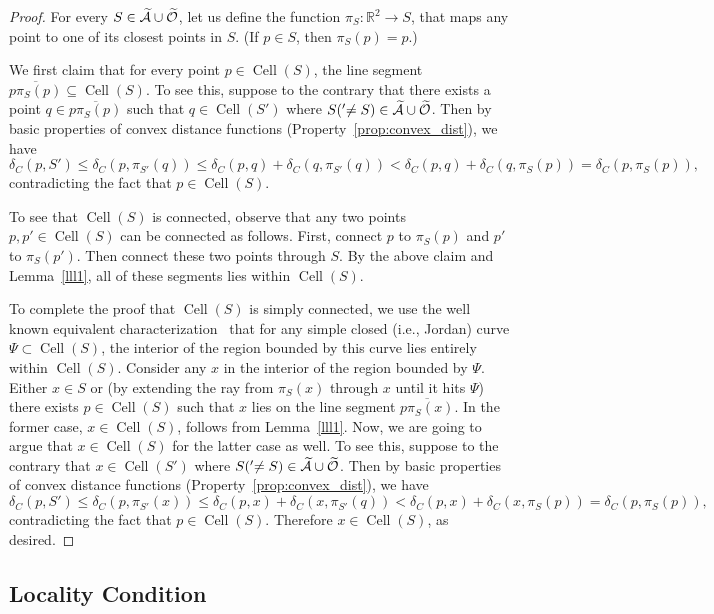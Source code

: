 \documentclass[a4paper,11pt]{article}
\DeclareMathOperator{\Cell}{Cell}
\begin{document}
\begin{proof}
For every $S\in \widetilde{\cal A}\cup 
\widetilde{\cal O}$, let us define the function $\pi_S \colon \mathbb{R}^2 \to S$, that maps any point to one of its closest points in $S$. (If $p \in S$, then $\pi_S(p) = p$.) 


We first claim that for every point $p  \in \Cell(S)$, the line segment $\overline{p\pi_S(p)} \subseteq \Cell(S)$. To see this, suppose to the contrary that there exists a point $q \in\overline{p\pi_S(p)}$  such that $q\in \Cell(S')$ where $S('\neq S)\in \widetilde{\cal A}\cup 
\widetilde{\cal O}$. Then by basic
properties of convex distance functions (Property~\ref{prop:convex_dist}), we have
\[\delta_C(p, S')  \leq \delta_C(p, \pi_{S'}(q)) \leq \delta_C(p,q) + \delta_C(q, \pi_{S'}(q)) < \delta_C(p,q) + \delta_C(q, \pi_S(p)) = \delta_C(p, \pi_S(p)),\] contradicting the fact that $p\in \Cell(S)$. 


To see that $\Cell(S)$ is connected, observe that any two points $p, p' \in \Cell(S)$ can be connected as follows. 
First, connect $p$ to $\pi_S(p)$ and $p'$ to $\pi_S(p')$. 
Then connect these two points through
$S$. 
By the above claim and Lemma~\ref{lll1}, all of these segments lies within $\Cell(S)$.

To complete the proof that $\Cell(S)$ is simply connected, we use the well known equivalent characterization~\cite{KleinW88} that for any simple closed (i.e., Jordan) curve $\Psi \subset \Cell(S)$, the interior of the region bounded by this curve lies entirely within $\Cell(S)$. 
Consider any $x$ in the interior of the region bounded by $\Psi$. 
Either $x \in S$ or (by extending the ray from $\pi_S(x)$ through $x$ until it hits $\Psi$) there exists $p \in \Cell(S)$ such that $x$ lies on the line segment $\overline{p\pi_S(x)}$. In the former case, $x\in \Cell(S)$, follows from Lemma~\ref{lll1}. Now, we are going to argue that $x\in \Cell(S)$ for the latter case as well. To see this, suppose to the contrary that $x\in \Cell(S')$ where $S('\neq S)\in \widetilde{\cal A}\cup 
\widetilde{\cal O}$.
Then by basic
properties of convex distance functions (Property~\ref{prop:convex_dist}), we have
\[\delta_C(p, S')  \leq \delta_C(p, \pi_{S'}(x)) \leq \delta_C(p,x) + \delta_C(x, \pi_{S'}(q)) < \delta_C(p,x) + \delta_C(x, \pi_S(p)) = \delta_C(p, \pi_S(p)),\] contradicting the fact that $p\in \Cell(S)$. Therefore $x \in \Cell(S)$, as desired. 
\end{proof}


\subsection{Locality Condition}
\label{loc-cond}
 
\end{document}
